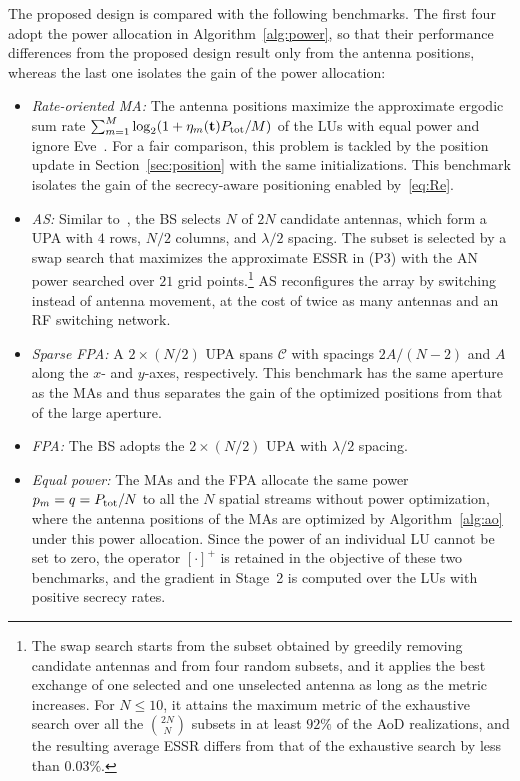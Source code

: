 \documentclass[journal]{IEEEtran}
\newcommand{\rev}[1]{{\color{red}#1}}
\newcommand{\rev}[1]{#1}
\begin{document}
\rev{The proposed design is compared with the following benchmarks. The first four adopt the power allocation in Algorithm~\ref{alg:power}, so that their performance differences from the proposed design result only from the antenna positions, whereas the last one isolates the gain of the power allocation:}
\begin{itemize}
\item \textit{Rate-oriented MA:} The antenna positions maximize the approximate ergodic sum rate $\sum_{m=1}^M\log_2(1+\eta_m(\mathbf{t})P_{\mathrm{tot}}/M)$ of the LUs with equal power and ignore Eve~\cite{ZhengTCOM2025}. For a fair comparison, this problem is tackled by the position update in Section~\ref{sec:position} with the same initializations. This benchmark isolates the gain of the secrecy-aware positioning enabled by~\eqref{eq:Re}.
\item \textit{AS:} Similar to~\cite{ChenArxiv2026}, the BS selects $N$ of $2N$ candidate antennas, which form a UPA with $4$ rows, $N/2$ columns, and $\lambda/2$ spacing. The subset is selected by a swap search that maximizes the approximate ESSR in (P3) with the AN power searched over $21$ grid points.\footnote{The swap search starts from the subset obtained by greedily removing candidate antennas and from four random subsets, and it applies the best exchange of one selected and one unselected antenna as long as the metric increases. For $N\le10$, it attains the maximum metric of the exhaustive search over all the $\binom{2N}{N}$ subsets in at least \rev{$92\%$} of the AoD realizations, and the resulting average ESSR differs from that of the exhaustive search by less than \rev{$0.03\%$}.} \rev{AS reconfigures the array by switching instead of antenna movement, at the cost of} twice as many antennas and an RF switching network.
\item \textit{Sparse FPA:} A $2\times(N/2)$ UPA spans $\mathcal C$ with spacings $2A/(N-2)$ and $A$ along the $x$- and $y$-axes, respectively. This benchmark has the same aperture as the MAs and thus separates the gain of the optimized positions from that of the large aperture.
\item \textit{FPA:} The BS adopts the $2\times(N/2)$ UPA with $\lambda/2$ spacing.
\item \rev{\textit{Equal power:} The MAs and the FPA allocate the same power $p_m=q=P_{\mathrm{tot}}/N$ to all the $N$ spatial streams without power optimization, where the antenna positions of the MAs are optimized by Algorithm~\ref{alg:ao} under this power allocation. Since the power of an individual LU cannot be set to zero, the operator $[\cdot]^+$ is retained in the objective of these two benchmarks, and the gradient in Stage~2 is computed over the LUs with positive secrecy rates.}
\end{itemize}
\end{document}
